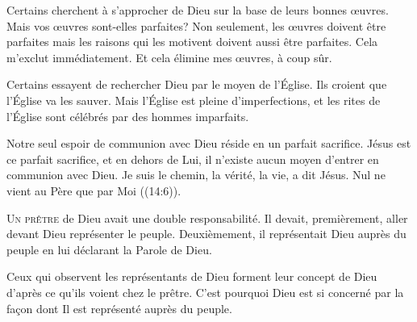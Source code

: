 Certains cherchent à s'approcher de Dieu sur la base de leurs bonnes \oe{}uvres.
 Mais vos \oe{}uvres sont-elles parfaites?
 Non seulement, les \oe{}uvres doivent être parfaites mais les raisons
 qui les motivent doivent aussi être parfaites. Cela m'exclut immédiatement.
 Et cela élimine mes \oe{}uvres, à coup sûr. 

Certains essayent de rechercher Dieu par le moyen de l'Église.
 Ils croient que l'Église
 va les sauver. Mais l'Église est pleine d'imperfections,
 et les rites de l'Église sont célébrés par des hommes imparfaits. 

Notre seul espoir de communion avec Dieu réside en un parfait sacrifice.
 Jésus est ce parfait sacrifice, et en dehors de Lui,
 il n'existe aucun moyen d'entrer en communion avec Dieu.
 \Og Je suis le chemin, la vérité, la vie, a dit Jésus.
 Nul ne vient au Père que par Moi \Fg{} ((14:6)). 

\dvrule







\lettrine{U}{n prêtre} de Dieu avait une double responsabilité.
 Il devait, premièrement, aller devant Dieu représenter le peuple.
 Deuxièmement, il représentait Dieu auprès du peuple
 en lui déclarant la Parole de Dieu. 


Ceux qui observent les représentants de Dieu forment leur concept de Dieu
 d'après ce qu'ils voient chez le prêtre.
 C'est pourquoi Dieu est si concerné par la fa\c{c}on dont Il est représenté
 auprès du peuple. 

